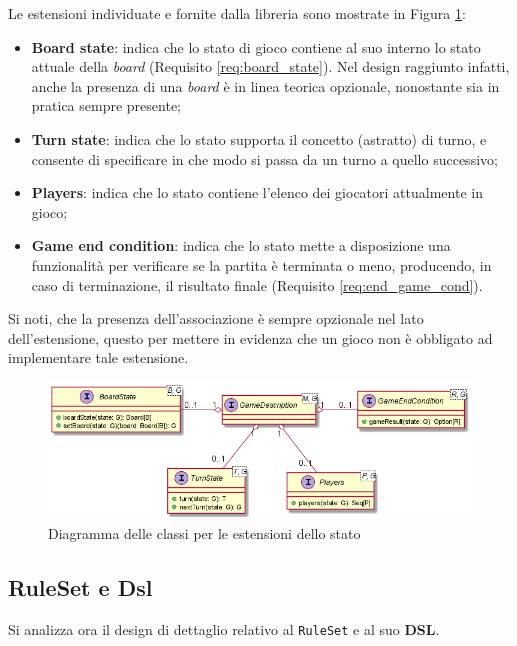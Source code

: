 Le estensioni individuate e fornite dalla libreria sono mostrate in Figura \ref{fig:extensions}:
%
\begin{itemize}
    \item \textbf{Board state}: indica che lo stato di gioco contiene al suo interno lo stato attuale della \textit{board} (Requisito \ref{req:board_state}).
    Nel design raggiunto infatti, anche la presenza di una \textit{board} è in linea teorica opzionale, nonostante sia in pratica sempre presente;
    \item \textbf{Turn state}: indica che lo stato supporta il concetto (astratto) di turno, e consente di specificare in che modo si passa da un turno a quello successivo;
    \item \textbf{Players}: indica che lo stato contiene l'elenco dei giocatori attualmente in gioco;
    \item \textbf{Game end condition}: indica che lo stato mette a disposizione una funzionalità per verificare se la partita è terminata o meno, producendo, in caso di terminazione, il risultato finale (Requisito \ref{req:end_game_cond}).
\end{itemize}
%
Si noti, che la presenza dell'associazione è sempre opzionale nel lato dell'estensione, questo per mettere in evidenza che un gioco non è obbligato ad implementare tale estensione.
%
\begin{figure}
    \centering
    \includegraphics[width=\linewidth]{images/uml/extensions.png}
    \caption{Diagramma delle classi per le estensioni dello stato}
    \label{fig:extensions}
\end{figure}


\subsection{RuleSet e Dsl}\label{sec:dsl_design}

Si analizza ora il design di dettaglio relativo al \texttt{RuleSet} e al suo \textbf{DSL}.

